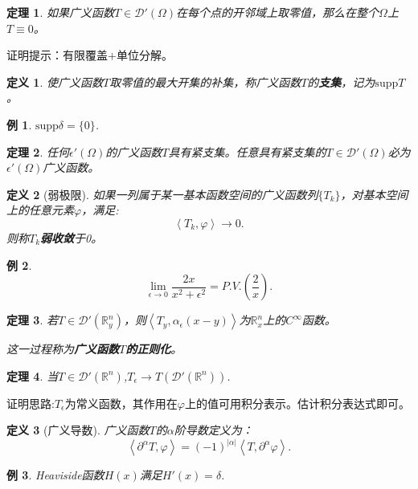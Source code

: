 \documentclass[a4paper]{ctexart}
\newtheorem{Definition}{\hspace{2em}定义}[section]
\newtheorem{Example}{\hspace{2em}例}[section]
\newtheorem{Thm}{\hspace{2em}定理}[section]
\newcommand{\supp}{\text{supp}}
\newcommand{\Rn}{\mathbb{R}^{n}}
\newcommand{\innerprod}[2]{\left<#1,#2\right>}
\begin{document}
\begin{Thm}
    如果广义函数$T\in\mathcal{D}'(\Omega)$在每个点的开邻域上取零值，那么在整个$\Omega$上$T\equiv 0$。
\end{Thm}
证明提示：有限覆盖+单位分解。
\begin{Definition}
    使广义函数$T$取零值的最大开集的补集，称广义函数$T$的\textbf{支集}，记为$\supp T$。
\end{Definition}
\begin{Example}
    $\supp\delta=\{0\}$.
\end{Example}
\begin{Thm}
    任何$\epsilon'(\Omega)$的广义函数$T$具有紧支集。任意具有紧支集的$T\in\mathcal{D}'(\Omega)$必为$\epsilon'(\Omega)$广义函数。
\end{Thm}
\begin{Definition}[弱极限]
    如果一列属于某一基本函数空间的广义函数列$\{T_{k}\}$，对基本空间上的任意元素$\varphi$，满足:
    \begin{equation}
        \innerprod{T_{k}}{\varphi}\rightarrow 0.
    \end{equation}
    则称$T_{k}$\textbf{弱收敛}于0。
\end{Definition}
\begin{Example}
    \begin{equation}
        \lim_{\epsilon\rightarrow 0} \frac{2x}{x^2+\epsilon^2}=P.V.(\frac{2}{x}).
    \end{equation}
\end{Example}
\begin{Thm}
    若$T\in\mathcal{D}'(\mathbb{R}_{y}^{n})$，则$\innerprod{T_{y}}{\alpha_{\epsilon}(x-y)}$为$\mathbb{R}_{x}^{n}$上的$C^{\infty}$函数。

    这一过程称为\textbf{广义函数$T$的正则化}。
\end{Thm}
\begin{Thm}
    当$T\in\mathcal{D}'(\Rn)$,$T_{\epsilon}\rightarrow T(\mathcal{D}'(\Rn))$.
\end{Thm}
证明思路:$T_{\epsilon}$为常义函数，其作用在$\varphi$上的值可用积分表示。估计积分表达式即可。
\begin{Definition}[广义导数]
    广义函数$T$的$\alpha$阶导数定义为：
    \begin{equation}
        \innerprod{\partial^{\alpha}T}{\varphi}=(-1)^{|\alpha|}\innerprod{T}{\partial^{\alpha}\varphi}.
    \end{equation}
\end{Definition}
\begin{Example}
    Heaviside函数$H(x)$满足$H'(x)=\delta$.
\end{Example}
\end{document}

